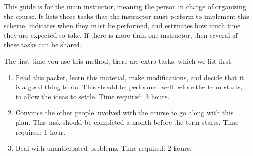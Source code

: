 %
%
%
%
%
%
%


 This guide is for the main instructor, meaning the person in charge of
organizing the course. It lists those tasks that the instructor must
perform to implement this scheme, indicates when they must be performed,
and estimates how much time they are expected to take.
If there is more than one instructor, then several of these tasks can be
shared.

The first time you use this method, there are extra tasks, which
we list first.
\begin{enumerate}
	\item Read this packet, learn this material, make modifications,
and decide that it is a good thing to do. This should be performed well
before the term starts, to allow the ideas to settle. Time required: 3
hours.
	\item Convince the other people involved with the course to go
along with this plan. This task should be completed a month before the
term starts. Time required: 1 hour.
	\item Deal with unanticipated problems. Time required: 2 hours.
\end{enumerate}

